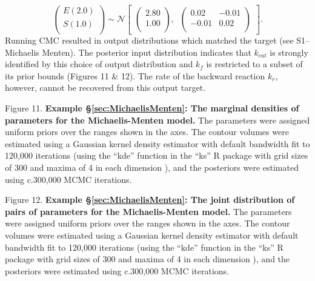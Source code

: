 \documentclass[10pt,letterpaper]{article}
\begin{document}
%
\begin{equation}\label{eq:MM_outputDistribution}
\begin{pmatrix}
E(2.0)\\
S(1.0)\\
\end{pmatrix} \sim  \mathcal{N}
\begin{bmatrix}
\begin{pmatrix}
2.80\\
1.00\\
\end{pmatrix}, \;\;
\begin{pmatrix}
0.02 & -0.01\\
-0.01 & 0.02\\
\end{pmatrix}
\end{bmatrix}.
\end{equation}
%
Running CMC resulted in output distributions which matched the target (see S1--Michaelis Menten).
The posterior input distribution indicates that $k_{cat}$ is strongly identified by this choice of output distribution and $k_f$ is restricted to a subset of its prior bounds (Figures 11 \& 12). The rate of the backward reaction $k_r$, however, cannot be recovered from this output target.

\vspace{0.5cm}

Figure 11. {\bf Example \S \ref{sec:MichaelisMenten}: The marginal densities of parameters for the Michaelis-Menten model.} The parameters were assigned uniform priors over the ranges shown in the axes. The contour volumes were estimated using a Gaussian kernel density estimator with default bandwidth fit to 120,000 iterations (using the ``kde'' function in the ``ks'' R \cite{RLanguage} package with grid sizes of 300 and maxima of 4 in each dimension \cite{duong2018package}), and the posteriors were estimated using c.300,000 MCMC iterations.

\vspace{0.5cm}

Figure 12. {\bf Example \S \ref{sec:MichaelisMenten}: The joint distribution of pairs of parameters for the Michaelis-Menten model.} The parameters were assigned uniform priors over the ranges shown in the axes. The contour volumes were estimated using a Gaussian kernel density estimator with default bandwidth fit to 120,000 iterations (using the ``kde'' function in the ``ks'' R \cite{RLanguage} package with grid sizes of 300 and maxima of 4 in each dimension \cite{duong2018package}), and the posteriors were estimated using c.300,000 MCMC iterations.
\end{document}
